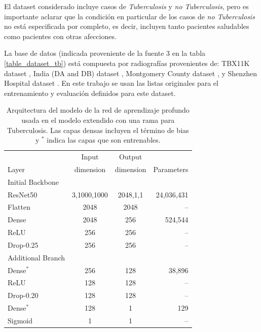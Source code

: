 El dataset considerado incluye casos de \textit{Tuberculosis} y \textit{no Tuberculosis}, pero es
importante aclarar que la condición en particular de los casos de \textit{no Tuberculosis} no está
especificada por completo, es decir, incluyen tanto pacientes saludables como pacientes con otras
afecciones.

La base de datos (indicada proveniente de la fuente 3 en la tabla \ref{table_dataset_tb}) está
compuesta por radiografías provenientes de: TBX11K dataset \cite{liu2020rethinking}, India (DA and DB)
dataset \cite{chauhan2014role}, Montgomery County dataset \cite{jaeger2014two}, y Shenzhen Hospital
dataset \cite{jaeger2014two}. En este trabajo se usan las listas originales para el entrenamiento y
evaluación definidos para este dataset.


\begin{table}[!ht]
    \centering
    \begin{tabular}{| l| c | c | r |}
     \hline
                 &  Input       & Output           &   \\
    Layer        &  dimension    & dimension        & Parameters \\
    \hline\hline
    Initial Backbone & & & \\ \hline
    ResNet50     &  3,1000,1000 &     2048,1,1     & 24,036,431 \\
    Flatten      &     2048     &     2048         &  --        \\
    Dense        &     2048     &     256          & 524,544    \\
    ReLU         &     256      &     256          & --         \\
    Drop-0.25    &     256      &     256          & --         \\
    \hline
    Additional Branch & & & \\ \hline
    Dense$^\ast$ &     256      &     128          &  38,896     \\
    ReLU         &     128      &     128          & --         \\
    Drop-0.20    &     128      &     128          & --         \\
    Dense$^\ast$ &     128      &      1           &  129       \\
    Sigmoid      &      1       &      1           & --         \\
     \hline
    \end{tabular}
    \caption{ Arquitectura del modelo de la red de aprendizaje profundo usada en el modelo extendido
             con una rama para Tuberculosis. Las capas densas incluyen el término de bias y $^\ast$
             indica las capas que son entrenables.}
\label{table_resnet50_tb}
\end{table}

